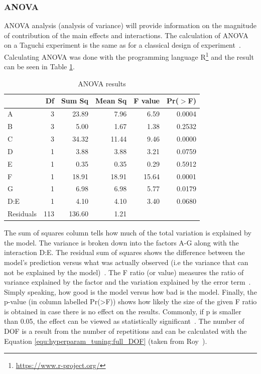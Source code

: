 \subsubsection{ANOVA}
ANOVA analysis (analysis of variance) will provide information on the magnitude of contribution of the main effects and interactions. The calculation of ANOVA on a Taguchi experiment is the same as for a classical design of experiment~\cite{yang_design_2009}. Calculating ANOVA was done with the programming language R\footnote{\href{https://www.r-project.org/}{https://www.r-project.org/}} and the result can be seen in Table \ref{tab:taguchi:anova_results}.

\begin{table}[ht]
	\centering
	\begin{tabular}{lrrrrr}
		\hline
		& Df & Sum Sq & Mean Sq & F value & Pr($>$F) \\ 
		\hline
		A & 3 & 23.89 & 7.96 & 6.59 & 0.0004 \\ 
		B & 3 & 5.00 & 1.67 & 1.38 & 0.2532 \\ 
		C & 3 & 34.32 & 11.44 & 9.46 & 0.0000 \\ 
		D & 1 & 3.88 & 3.88 & 3.21 & 0.0759 \\ 
		E & 1 & 0.35 & 0.35 & 0.29 & 0.5912 \\ 
		F & 1 & 18.91 & 18.91 & 15.64 & 0.0001 \\ 
		G & 1 & 6.98 & 6.98 & 5.77 & 0.0179 \\ 
		D:E & 1 & 4.10 & 4.10 & 3.40 & 0.0680 \\ 
		Residuals & 113 & 136.60 & 1.21 &  &  \\ 
		\hline
	\end{tabular}
	\caption{ANOVA results}
	\label{tab:taguchi:anova_results}
\end{table}

The sum of squares column tells how much of the total variation is explained by the model. The variance is broken down into the factors A-G along with the interaction D:E. The residual sum of squares shows the difference between the model's prediction versus what was actually observed (i.e the variance that can not be explained by the model)~\cite{field_discovering_2012}. The F ratio (or value) measures the ratio of variance explained by the factor and the variation explained by the error term~\cite{field_discovering_2012}. Simply speaking, how good is the model versus how bad is the model. Finally, the p-value (in column labelled Pr(>F)) shows how likely the size of the given F ratio is obtained in case there is no effect on the results. Commonly, if p is smaller than 0.05, the effect can be viewed as statistically significant~\cite{field_discovering_2012}. The number of DOF is a result from the number of repetitions and can be calculated with the Equation \ref{equ:hyperparam_tuning:full_DOF} (taken from Roy~\cite{roy_primer_1990}).

